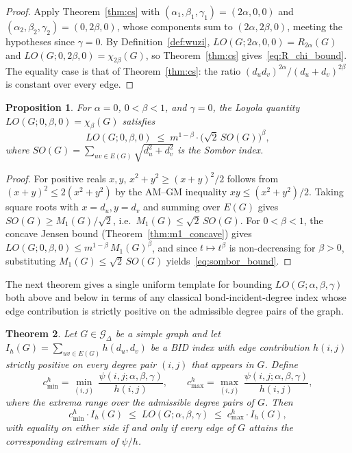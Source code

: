 \documentclass[a5paper, 10pt]{article}
\theoremstyle{plain}
\newtheorem{theorem}{Theorem}
\newtheorem{proposition}[theorem]{Proposition}
\theoremstyle{remark}
\theoremstyle{definition}
\newcommand{\Wuzi}{LO(G;\alpha,\beta,\gamma)}
\begin{document}
  \begin{proof}
  Apply Theorem~\ref{thm:cs} with
  $(\alpha_1, \beta_1, \gamma_1) = (2\alpha, 0, 0)$ and
  $(\alpha_2, \beta_2, \gamma_2) = (0, 2\beta, 0)$, whose components
  sum to $(2\alpha, 2\beta, 0)$, meeting the hypotheses since
  $\gamma = 0$. By Definition~\ref{def:wuzi},
  $LO(G; 2\alpha, 0, 0) = R_{2\alpha}(G)$ and
  $LO(G; 0, 2\beta, 0) = \chi_{2\beta}(G)$, so Theorem~\ref{thm:cs}
  gives~\eqref{eq:R_chi_bound}. The equality case is that of
  Theorem~\ref{thm:cs}: the ratio
  $(d_u d_v)^{2\alpha}/(d_u + d_v)^{2\beta}$ is constant over every
  edge.
  \end{proof}

  \begin{proposition}\label{thm:sombor}
  For $\alpha = 0$, $0 < \beta < 1$, and $\gamma = 0$, the Loyola
  quantity $LO(G; 0, \beta, 0) = \chi_{\beta}(G)$ satisfies
  \begin{equation}\label{eq:sombor_bound}
  LO(G; 0, \beta, 0)
  \;\le\; m^{1 - \beta} \cdot \bigl(\sqrt{2}\, SO(G)\bigr)^{\beta},
  \end{equation}
  where $SO(G) = \sum_{uv \in E(G)} \sqrt{d_u^2 + d_v^2}$ is the
  Sombor index.
  \end{proposition}

  \begin{proof}
  For positive reals $x, y$, $x^2 + y^2 \ge (x + y)^2/2$ follows from
  $(x + y)^2 \le 2(x^2 + y^2)$ by the AM--GM inequality
  $xy \le (x^2 + y^2)/2$. Taking square roots with $x = d_u, y = d_v$
  and summing over $E(G)$ gives
  $SO(G) \ge M_1(G)/\sqrt{2}$, i.e.\ $M_1(G) \le \sqrt{2}\, SO(G)$.
  For $0 < \beta < 1$, the concave Jensen bound
  (Theorem~\ref{thm:m1_concave}) gives
  $LO(G; 0, \beta, 0) \le m^{1 - \beta}\, M_1(G)^{\beta}$, and since
  $t \mapsto t^{\beta}$ is non-decreasing for $\beta > 0$,
  substituting $M_1(G) \le \sqrt{2}\, SO(G)$
  yields~\eqref{eq:sombor_bound}.
  \end{proof}

  The next theorem gives a single uniform template for bounding
  $\Wuzi$ both above and below in terms of any classical
  bond-incident-degree index whose edge contribution is strictly
  positive on the admissible degree pairs of the graph.

  \begin{theorem}\label{thm:ratio_bound}
  Let $G \in \mathcal{G}_{\Delta}$ be a simple graph and let
  $I_h(G) = \sum_{uv \in E(G)} h(d_u, d_v)$ be a BID index with
  edge contribution $h(i, j)$ strictly positive on every degree pair
  $(i, j)$ that appears in $G$. Define
  \[
  c_{\min}^{h} = \min_{(i, j)}\,\frac{\psi(i, j; \alpha, \beta,
  \gamma)}{h(i, j)},
  \qquad
  c_{\max}^{h} = \max_{(i, j)}\,\frac{\psi(i, j; \alpha, \beta,
  \gamma)}{h(i, j)},
  \]
  where the extrema range over the admissible degree pairs of $G$.
  Then
  \begin{equation}\label{eq:ratio_bound}
  c_{\min}^{h} \cdot I_h(G)
  \;\le\; \Wuzi
  \;\le\; c_{\max}^{h} \cdot I_h(G),
  \end{equation}
  with equality on either side if and only if every edge of $G$
  attains the corresponding extremum of $\psi/h$.
  \end{theorem}
\end{document}
